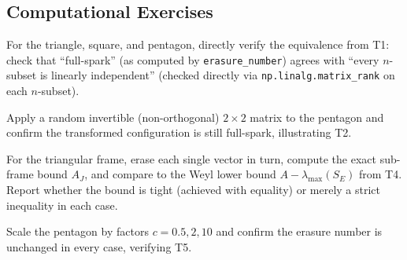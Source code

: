\subsection*{Computational Exercises}
\begin{compexercises}
	\item For the triangle, square, and pentagon, directly verify the
	equivalence from T1: check that ``full-spark'' (as computed by
	\texttt{erasure\_number}) agrees with ``every $n$-subset is
	linearly independent'' (checked directly via
	\texttt{np.linalg.matrix\_rank} on each $n$-subset).
	
	\item Apply a random invertible (non-orthogonal) $2\times2$ matrix to
	the pentagon and confirm the transformed configuration is still
	full-spark, illustrating T2.
	
	\item For the triangular frame, erase each single vector in turn,
	compute the exact sub-frame bound $A_J$, and compare to the Weyl
	lower bound $A-\lambda_{\max}(S_E)$ from T4. Report whether the
	bound is tight (achieved with equality) or merely a strict
	inequality in each case.
	
	\item Scale the pentagon by factors $c=0.5,2,10$ and confirm the
	erasure number is unchanged in every case, verifying T5.
\end{compexercises}
